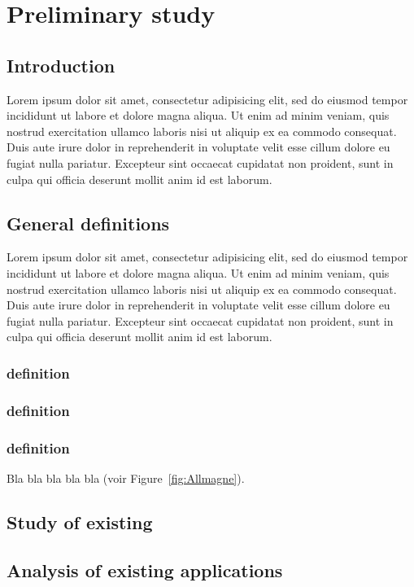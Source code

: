 \chapter{Preliminary study}

\section{Introduction}
Lorem ipsum dolor sit amet, consectetur adipisicing elit, sed do eiusmod
tempor incididunt ut labore et dolore magna aliqua. Ut enim ad minim veniam,
quis nostrud exercitation ullamco laboris nisi ut aliquip ex ea commodo
consequat. Duis aute irure dolor in reprehenderit in voluptate velit esse
cillum dolore eu fugiat nulla pariatur. Excepteur sint occaecat cupidatat non
proident, sunt in culpa qui officia deserunt mollit anim id est laborum.

\section{General definitions}
Lorem ipsum dolor sit amet, consectetur adipisicing elit, sed do eiusmod
tempor incididunt ut labore et dolore magna aliqua. Ut enim ad minim veniam,
quis nostrud exercitation ullamco laboris nisi ut aliquip ex ea commodo
consequat. Duis aute irure dolor in reprehenderit in voluptate velit esse
cillum dolore eu fugiat nulla pariatur. Excepteur sint occaecat cupidatat non
proident, sunt in culpa qui officia deserunt mollit anim id est laborum.

\subsection{definition}
\subsection{definition}
\subsection{definition}
Bla bla bla bla bla (voir Figure~\ref{fig:Allmagne}).

\section{Study of existing}
\section{Analysis of existing applications}

